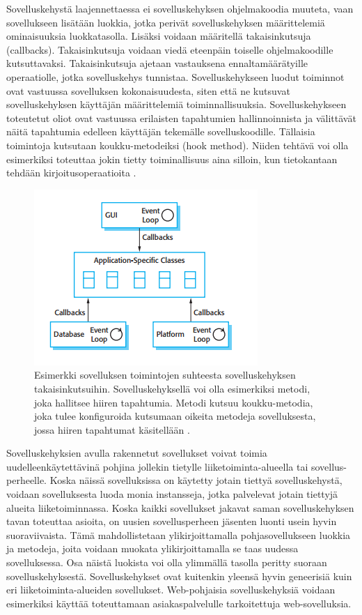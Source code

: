 \documentclass[utf8]{gradu3}
\begin{document}
Sovelluskehystä laajennettaessa ei sovelluskehyksen ohjelmakoodia muuteta, vaan sovellukseen lisätään luokkia, jotka perivät sovelluskehyksen määrittelemiä ominaisuuksia luokkatasolla. Lisäksi voidaan määritellä takaisinkutsuja (callbacks). Takaisinkutsuja voidaan viedä eteenpäin toiselle ohjelmakoodille kutsuttavaksi. Takaisinkutsuja ajetaan vastauksena ennaltamäärätyille operaatiolle, jotka sovelluskehys tunnistaa. Sovelluskehykseen luodut toiminnot ovat vastuussa sovelluksen kokonaisuudesta, siten että ne kutsuvat sovelluskehyksen käyttäjän määrittelemiä toiminnallisuuksia. Sovelluskehykseen toteutetut oliot ovat vastuussa erilaisten tapahtumien hallinnoinnista ja välittävät näitä tapahtumia edelleen käyttäjän tekemälle sovelluskoodille.  Tällaisia toimintoja kutsutaan koukku-metodeiksi (hook method). Niiden tehtävä voi olla esimerkiksi toteuttaa jokin tietty toiminallisuus aina silloin, kun tietokantaan tehdään kirjoitusoperaatioita \parencite[s. 433]{Sommerville}. 

\begin{figure}[h]
\centering
\includegraphics[scale=0.85]{frameworks.png}
\caption{Esimerkki sovelluksen toimintojen suhteesta sovelluskehyksen takaisinkutsuihin. Sovelluskehyksellä voi olla esimerkiksi metodi, joka hallitsee hiiren tapahtumia. Metodi kutsuu koukku-metodia, joka tulee konfiguroida kutsumaan oikeita metodeja sovelluksesta, jossa hiiren tapahtumat käsitellään  \parencite[s.434]{Sommerville}.}
\end{figure}

Sovelluskehyksien avulla rakennetut sovellukset voivat toimia uudelleenkäytettävinä pohjina jollekin tietylle liiketoiminta-alueella tai sovellus-perheelle. Koska näissä sovelluksissa on käytetty jotain tiettyä sovelluskehystä, voidaan sovelluksesta luoda monia instansseja, jotka palvelevat jotain tiettyjä alueita liiketoiminnassa. Koska kaikki sovellukset jakavat saman sovelluskehyksen tavan toteuttaa asioita, on uusien sovellusperheen jäsenten luonti usein hyvin suoraviivaista. Tämä mahdollistetaan ylikirjoittamalla pohjasovellukseen luokkia ja metodeja, joita voidaan muokata ylikirjoittamalla se taas uudessa sovelluksessa. Osa näistä luokista voi olla ylimmällä tasolla peritty suoraan sovelluskehyksestä. Sovelluskehykset ovat kuitenkin yleensä hyvin geneerisiä kuin eri
liiketoiminta-alueiden sovellukset. Web-pohjaisia sovelluskehyksiä voidaan esimerkiksi käyttää toteuttamaan asiakaspalvelulle tarkoitettuja web-sovelluksia. 
\end{document}
